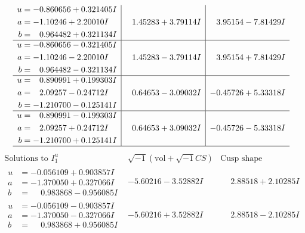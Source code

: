 \documentclass[1p]{elsarticle_modified}
\theoremstyle{definition}
\newcommand{\I}{\sqrt{-1}}
\begin{document}
$$\begin{array}{c|c|c}
\begin{aligned}
u &= -0.860656 + 0.321405 I \\
a &= -1.10246 + 2.20010 I \\
b &= \phantom{-}0.964482 + 0.321134 I\end{aligned}
 & \phantom{-}1.45283 + 3.79114 I & \phantom{-}3.95154 - 7.81429 I \\ \hline\begin{aligned}
u &= -0.860656 - 0.321405 I \\
a &= -1.10246 - 2.20010 I \\
b &= \phantom{-}0.964482 - 0.321134 I\end{aligned}
 & \phantom{-}1.45283 - 3.79114 I & \phantom{-}3.95154 + 7.81429 I \\ \hline\begin{aligned}
u &= \phantom{-}0.890991 + 0.199303 I \\
a &= \phantom{-}2.09257 - 0.24712 I \\
b &= -1.210700 - 0.125141 I\end{aligned}
 & \phantom{-}0.64653 - 3.09032 I & -0.45726 + 5.33318 I \\ \hline\begin{aligned}
u &= \phantom{-}0.890991 - 0.199303 I \\
a &= \phantom{-}2.09257 + 0.24712 I \\
b &= -1.210700 + 0.125141 I\end{aligned}
 & \phantom{-}0.64653 + 3.09032 I & -0.45726 - 5.33318 I\\
 \hline 
 \end{array}$$\newpage$$\begin{array}{c|c|c}  
\text{Solutions to }I^u_{1}& \I (\text{vol} + \sqrt{-1}CS) & \text{Cusp shape}\\
 \hline 
\begin{aligned}
u &= -0.056109 + 0.903857 I \\
a &= -1.370050 + 0.327066 I \\
b &= \phantom{-}0.983868 - 0.956085 I\end{aligned}
 & -5.60216 - 3.52882 I & \phantom{-}2.88518 + 2.10285 I \\ \hline\begin{aligned}
u &= -0.056109 - 0.903857 I \\
a &= -1.370050 - 0.327066 I \\
b &= \phantom{-}0.983868 + 0.956085 I\end{aligned}
 & -5.60216 + 3.52882 I & \phantom{-}2.88518 - 2.10285 I \\ \hline\begin{aligned}

\end{aligned}
\end{array}$$
\end{document}
